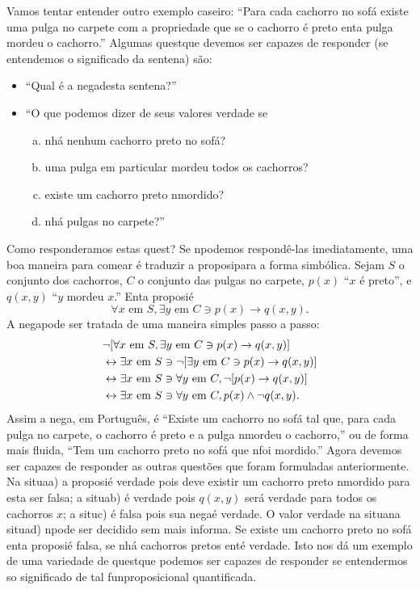Vamos tentar entender outro exemplo caseiro: ``Para cada cachorro no sof\'a existe uma pulga no carpete com a propriedade que se o cachorro \'e preto ent\ao a pulga mordeu o cachorro.'' Algumas quest\oes que devemos ser capazes de responder (se entendemos o significado da senten\cc a) são: 
\begin{itemize}
	\item ``Qual \'e a nega\cao desta senten\cc a?'' 
	\item ``O que podemos dizer de seus valores verdade se
\begin{enumerate}[a)]
\item n\ao h\'a nenhum cachorro preto no sof\'a? 
\item uma pulga em particular mordeu todos os cachorros?
\item existe um cachorro preto n\ao mordido?
\item n\ao h\'a pulgas no carpete?''
\end{enumerate}

\end{itemize}
Como responder\ih amos estas quest\ois? Se n\ao podemos respondê-las imediatamente, uma boa maneira para come\cc ar \'e traduzir a proposi\cao para a forma simb\'olica. Sejam $S$ o conjunto dos cachorros, $C$ o conjunto das pulgas no carpete, $p(x)$ ``$x$ \'e preto'', e $q(x,y)$  ``$y$ mordeu $x$.'' Ent\ao a proposi\cao \'e
\[
\forall x \textrm{ em } S, \exists y \textrm{ em } C \ni  p(x)\to q(x,y).
\]
A nega\cao pode ser tratada de uma maneira simples passo a passo:
\begin{equation*}
 \begin{aligned}
&\lnot[\forall x \textrm{ em } S, \exists y \textrm{ em } C \ni  p(x)\to q(x,y)]\\
&\leftrightarrow \exists x \textrm{ em } S \ni \lnot[\exists y \textrm{ em } C \ni  p(x)\to q(x,y)]\\
&\leftrightarrow \exists x \textrm{ em } S \ni \forall y \textrm{ em } C,  \lnot[p(x)\to q(x,y)]\\
&\leftrightarrow \exists x \textrm{ em } S \ni \forall y \textrm{ em } C,  p(x)\wedge\lnot q(x,y).
 \end{aligned}
\end{equation*}
Assim a nega\caoi, em Portugu\^es, \'e ``Existe um cachorro no sof\'a tal que, para cada pulga no carpete, o cachorro \'e preto e a pulga n\ao mordeu o cachorro,'' ou de forma mais fluida, ``Tem um cachorro preto no sof\'a que n\ao foi mordido.'' Agora devemos ser capazes de responder as outras quest\~oes que foram formuladas anteriormente. Na situa\cao a) a proposi\cao \'e verdade pois deve existir um cachorro preto n\ao mordido para esta ser falsa; a situa\cao b) \'e verdade pois $q(x,y)$ ser\'a verdade para todos os cachorros $x$; a situ\cao c) \'e falsa pois sua nega\cao \'e verdade. O valor verdade na situa\cao na situa\cao d) n\ao pode ser decidido sem mais informa\cois. Se existe um cachorro preto no sof\'a ent\ao a proposi\cao \'e falsa, se n\ao h\'a cachorros pretos ent\ao \'e verdade. Isto nos d\'a um exemplo de uma variedade de quest\oes que podemos ser capazes de responder se entendermos so significado de tal fun\cao proposicional quantificada.

